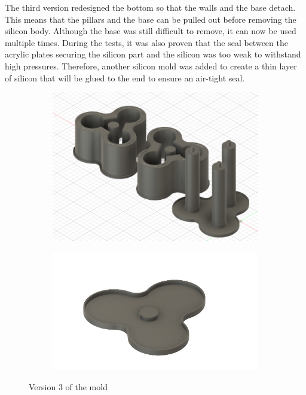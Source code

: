 \documentclass[twoside]{article}
\begin{document}
The third version redesigned the bottom so that the walls and the base detach. This means that the pillars and the base can be pulled out before removing the silicon body. Although the base was still difficult to remove, it can now be used multiple times. During the tests, it was also proven that the seal between the acrylic plates securing the silicon part and the silicon was too weak to withstand high pressures. Therefore, another silicon mold was added to create a thin layer of silicon that will be glued to the end to ensure an air-tight seal. 

\begin{figure} [H]
\centering
\begin{subfigure}[b]{0.5\linewidth}
		\centering
		\includegraphics[width=\textwidth]{mold_v3}
	\end{subfigure}%
	\begin{subfigure}[b]{0.5\linewidth}
		\centering		
		\includegraphics[width=\textwidth]{sealing_v3}
	\end{subfigure}
\caption{Version 3 of the mold}
\end{figure}
\end{document}
